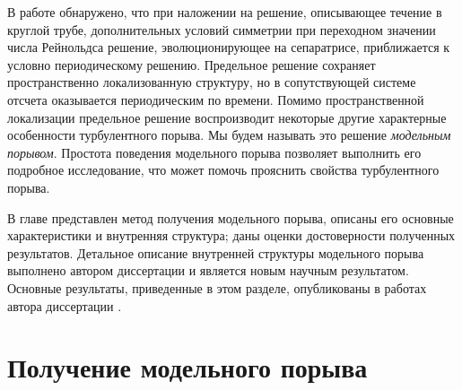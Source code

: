 В работе \cite{Avila2013} обнаружено, что при наложении на решение, описывающее течение в круглой трубе, дополнительных условий симметрии при переходном значении числа Рейнольдса решение, эволюционирующее на сепаратрисе, приближается к условно периодическому решению. Предельное решение сохраняет пространственно локализованную структуру, но в сопутствующей системе отсчета оказывается периодическим по времени. Помимо пространственной локализации предельное решение воспроизводит некоторые другие характерные особенности турбулентного порыва. Мы будем называть это решение {\it модельным порывом}. Простота поведения модельного порыва позволяет выполнить его подробное исследование, что может помочь прояснить свойства турбулентного порыва. 

В главе представлен метод получения модельного порыва, описаны его основные характеристики и внутренняя структура; даны оценки достоверности полученных результатов. Детальное описание внутренней структуры модельного порыва выполнено автором диссертации и является новым научным результатом. Основные результаты, приведенные в этом разделе, опубликованы в работах автора диссертации \cite{MZG2015, Kazan2015, KMU2015}. 


\section{Получение модельного порыва} \label{edge_seq}


